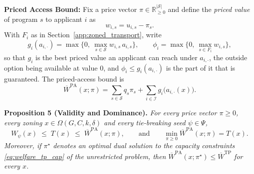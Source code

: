 \documentclass{article}
\begin{document}
\noindent\textbf{Priced Access Bound:}
Fix a price vector $\pi \in \mathbb{R}^{|\mathcal{S}|}_{\geq 0}$ and define the \emph{priced value} of program $s$ to applicant $i$ as
\begin{equation}\label{eq:pa_priced_value}
w_{i,s} = u_{i,s} - \pi_s .
\end{equation}
With $F_i$ as in Section~\ref{app:zoned_transport}, write
\begin{equation}\label{eq:pa_student_term}
g_i(a_{i, \cdot}) = \max\Big\{0, \ \max_{s \in \mathcal{S}} w_{i,s}\, a_{i,s}\Big\}, \qquad
\phi_i = \max\Big\{0, \ \max_{s \in F_i} w_{i,s}\Big\},
\end{equation}
so that $g_i$ is the best priced value an applicant can reach under $a_{i,\cdot}$, the outside option being available at value $0$, and $\phi_i \leq g_i(a_{i,\cdot})$ is the part of it that is guaranteed. The priced-access bound is
\begin{equation}\label{eq:pa_bound}
\overline{W}^{\mathrm{PA}}(x; \pi) = \sum_{s \in \mathcal{S}} q_s \pi_s + \sum_{i \in \mathcal{I}} g_i\big(a_{i, \cdot}(x)\big).
\end{equation}

\noindent\textbf{Proposition 5 (Validity and Dominance).} \textit{For every price vector $\pi \geq 0$, every zoning $x \in \Omega(G, C, k, \delta)$ and every tie-breaking seed $\psi \in \Psi$,}
\begin{equation}\label{eq:pa_chain}
W_\psi(x) \;\leq\; T(x) \;\leq\; \overline{W}^{\mathrm{PA}}(x; \pi),
\qquad\text{and}\qquad
\min_{\pi \geq 0} \overline{W}^{\mathrm{PA}}(x; \pi) = T(x).
\end{equation}
\textit{Moreover, if $\pi^\star$ denotes an optimal dual solution to the capacity constraints \eqref{eq:welfare_tp_cap} of the unrestricted problem, then $\overline{W}^{\mathrm{PA}}(x; \pi^\star) \leq \overline{W}^{\mathrm{TP}}$ for every $x$.}
\end{document}
